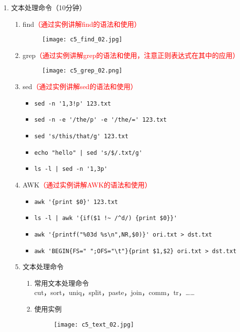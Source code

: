 \documentclass{TIJMUjiaoanSY}
\begin{document}
\begin{enumerate}
\otherTail
\newpage
\otherHeader

  \item 文本处理命令（10分钟）
    \begin{enumerate}
      \item find\textcolor{red}{（通过实例讲解find的语法和使用）}
	\begin{figure}[h]
	  \centering
	  \texttt{[image: c5\_find\_02.jpg]}
	\end{figure}
      \item grep\textcolor{red}{（通过实例讲解grep的语法和使用，注意正则表达式在其中的应用）}
	\begin{figure}[h]
	  \centering
	  \texttt{[image: c5\_grep\_02.png]}
	\end{figure}
      \item sed\textcolor{red}{（通过实例讲解sed的语法和使用）}
        \begin{itemize}
          \item \verb|sed -n '1,3!p' 123.txt|
          \item \verb|sed -n -e '/the/p' -e '/the/=' 123.txt|
          \item \verb|sed 's/this/that/g' 123.txt|
          \item \verb=echo "hello" | sed 's/$/.txt/g'=
          \item \verb=ls -l | sed -n '1,3p'=
        \end{itemize}
      \item AWK\textcolor{red}{（通过实例讲解AWK的语法和使用）}
        \begin{itemize}
          \item \verb|awk '{print $0}' 123.txt|
          \item \verb=ls -l | awk '{if($1 !~ /^d/) {print $0}}'=
          \item \verb|awk '{printf("%03d %s\n",NR,$0)}' ori.txt > dst.txt|
          \item \verb|awk 'BEGIN{FS=" ";OFS="\t"}{print $1,$2} ori.txt > dst.txt|
        \end{itemize}
      \item 文本处理命令
	\begin{enumerate}
	  \item 常用文本处理命令\\
	    cut，sort，uniq，split，paste，join，comm，tr，……
	  \item 使用实例
	    \begin{figure}[h]
	      \centering
	      \texttt{[image: c5\_text\_02.jpg]}
            \end{figure}
	\end{enumerate}
    \end{enumerate}


\end{enumerate}
\end{document}
